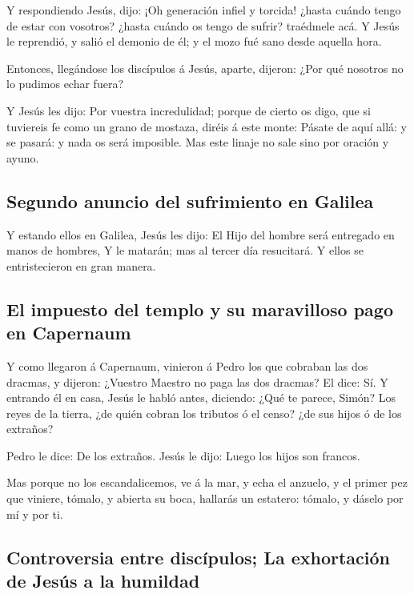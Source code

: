  Y respondiendo Jesús, dijo: ¡Oh generación infiel y
torcida! ¿hasta cuándo tengo de estar con vosotros? ¿hasta cuándo os
tengo de sufrir? traédmele acá.  Y Jesús le reprendió, y
salió el demonio de él; y el mozo fué sano desde aquella hora.

 Entonces, llegándose los discípulos á Jesús, aparte,
dijeron: ¿Por qué nosotros no lo pudimos echar fuera?

 Y Jesús les dijo: Por vuestra incredulidad; porque de
cierto os digo, que si tuviereis fe como un grano de mostaza, diréis á
este monte: Pásate de aquí allá: y se pasará: y nada os será imposible.
 Mas este linaje no sale sino por oración y ayuno.

\hypertarget{segundo-anuncio-del-sufrimiento-en-galilea}{%
\subsection{Segundo anuncio del sufrimiento en
Galilea}\label{segundo-anuncio-del-sufrimiento-en-galilea}}

 Y estando ellos en Galilea, Jesús les dijo: El Hijo del
hombre será entregado en manos de hombres,  Y le matarán;
mas al tercer día resucitará. Y ellos se entristecieron en gran manera.

\hypertarget{el-impuesto-del-templo-y-su-maravilloso-pago-en-capernaum}{%
\subsection{El impuesto del templo y su maravilloso pago en
Capernaum}\label{el-impuesto-del-templo-y-su-maravilloso-pago-en-capernaum}}

 Y como llegaron á Capernaum, vinieron á Pedro los que
cobraban las dos dracmas, y dijeron: ¿Vuestro Maestro no paga las dos
dracmas?  El dice: Sí. Y entrando él en casa, Jesús le
habló antes, diciendo: ¿Qué te parece, Simón? Los reyes de la tierra,
¿de quién cobran los tributos ó el censo? ¿de sus hijos ó de los
extraños?

 Pedro le dice: De los extraños. Jesús le dijo: Luego los
hijos son francos.

 Mas porque no los escandalicemos, ve á la mar, y echa el
anzuelo, y el primer pez que viniere, tómalo, y abierta su boca,
hallarás un estatero: tómalo, y dáselo por mí y por ti.

\hypertarget{controversia-entre-discuxedpulos-la-exhortaciuxf3n-de-jesuxfas-a-la-humildad}{%
\subsection{Controversia entre discípulos; La exhortación de Jesús a la
humildad}\label{controversia-entre-discuxedpulos-la-exhortaciuxf3n-de-jesuxfas-a-la-humildad}}

